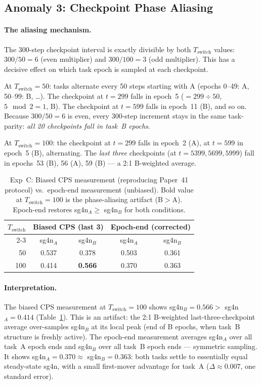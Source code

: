 \documentclass[11pt]{article}
\begin{document}
\subsection{Anomaly 3: Checkpoint Phase Aliasing}

\paragraph{The aliasing mechanism.}
The 300-step checkpoint interval is exactly divisible by both $T_\mathrm{switch}$
values: $300/50=6$ (even multiplier) and $300/100=3$ (odd multiplier).
This has a decisive effect on which task epoch is sampled at each checkpoint.

At $T_\mathrm{switch}=50$: tasks alternate every 50 steps starting with A
(epochs 0--49: A, 50--99: B, \ldots).
The checkpoint at $t=299$ falls in epoch~5 ($=299\div50$, $5\mod 2=1$, B).
The checkpoint at $t=599$ falls in epoch~11 (B), and so on.
Because $300/50=6$ is even, every 300-step increment stays in the same
task-parity: \emph{all 20 checkpoints fall in task~B epochs}.

At $T_\mathrm{switch}=100$: the checkpoint at $t=299$ falls in epoch~2 (A),
at $t=599$ in epoch~5 (B), alternating.
The \emph{last three} checkpoints (at $t=5399, 5699, 5999$) fall in
epochs~53 (B), 56 (A), 59 (B) --- a 2:1 B-weighted average.

\begin{table}[h]
  \centering
  \caption{Exp~C: Biased CPS measurement (reproducing Paper~41 protocol)
           vs.\ epoch-end measurement (unbiased).
           Bold value at $T_\mathrm{switch}=100$ is the phase-aliasing artifact (B$>$A).
           Epoch-end restores sg4n$_A \geq $ sg4n$_B$ for both conditions.}
  \label{tab:expc}
  \small
  \begin{tabular}{rcccc}
    \toprule
    $T_\mathrm{switch}$ & \multicolumn{2}{c}{Biased CPS (last 3)} & \multicolumn{2}{c}{Epoch-end (corrected)} \\
    \cmidrule{2-3} \cmidrule{4-5}
    & sg4n$_A$ & sg4n$_B$ & sg4n$_A$ & sg4n$_B$ \\
    \midrule
    50  & 0.537 & 0.378 & 0.503 & 0.361 \\
    100 & 0.414 & \textbf{0.566} & 0.370 & 0.363 \\
    \bottomrule
  \end{tabular}
\end{table}

\paragraph{Interpretation.}
The biased CPS measurement at $T_\mathrm{switch}=100$ shows sg4n$_B=0.566
>$ sg4n$_A=0.414$ (Table~\ref{tab:expc}).
This is an artifact: the 2:1 B-weighted last-three-checkpoint average
over-samples sg4n$_B$ at its local peak (end of B epochs, when task~B
structure is freshly active).
The epoch-end measurement averages sg4n$_A$ over all task~A epoch ends
and sg4n$_B$ over all task~B epoch ends --- symmetric sampling.
It shows sg4n$_A=0.370 \approx $ sg4n$_B=0.363$: both tasks settle to
essentially equal steady-state sg4n, with a small first-mover advantage
for task~A ($\Delta \approx 0.007$, one standard error).
\end{document}
